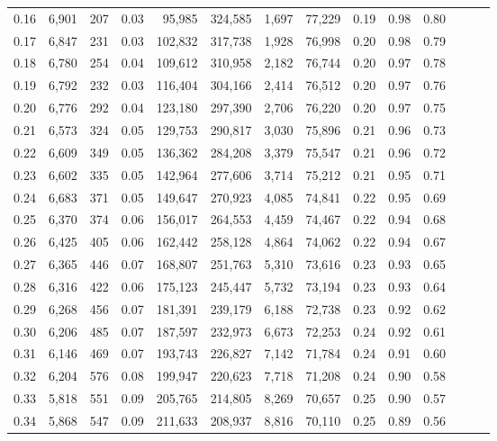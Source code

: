 \begin{tabular}{rrrrrrrrrrrrrr}
0.16 &  6,901 &    207 &  0.03 &   95,985 &  324,585 &   1,697 &  77,229 &  0.19 &  0.98 &      0.80 \\
0.17 &  6,847 &    231 &  0.03 &  102,832 &  317,738 &   1,928 &  76,998 &  0.20 &  0.98 &      0.79 \\
0.18 &  6,780 &    254 &  0.04 &  109,612 &  310,958 &   2,182 &  76,744 &  0.20 &  0.97 &      0.78 \\
0.19 &  6,792 &    232 &  0.03 &  116,404 &  304,166 &   2,414 &  76,512 &  0.20 &  0.97 &      0.76 \\
0.20 &  6,776 &    292 &  0.04 &  123,180 &  297,390 &   2,706 &  76,220 &  0.20 &  0.97 &      0.75 \\
0.21 &  6,573 &    324 &  0.05 &  129,753 &  290,817 &   3,030 &  75,896 &  0.21 &  0.96 &      0.73 \\
0.22 &  6,609 &    349 &  0.05 &  136,362 &  284,208 &   3,379 &  75,547 &  0.21 &  0.96 &      0.72 \\
0.23 &  6,602 &    335 &  0.05 &  142,964 &  277,606 &   3,714 &  75,212 &  0.21 &  0.95 &      0.71 \\
0.24 &  6,683 &    371 &  0.05 &  149,647 &  270,923 &   4,085 &  74,841 &  0.22 &  0.95 &      0.69 \\
0.25 &  6,370 &    374 &  0.06 &  156,017 &  264,553 &   4,459 &  74,467 &  0.22 &  0.94 &      0.68 \\
0.26 &  6,425 &    405 &  0.06 &  162,442 &  258,128 &   4,864 &  74,062 &  0.22 &  0.94 &      0.67 \\
0.27 &  6,365 &    446 &  0.07 &  168,807 &  251,763 &   5,310 &  73,616 &  0.23 &  0.93 &      0.65 \\
0.28 &  6,316 &    422 &  0.06 &  175,123 &  245,447 &   5,732 &  73,194 &  0.23 &  0.93 &      0.64 \\
0.29 &  6,268 &    456 &  0.07 &  181,391 &  239,179 &   6,188 &  72,738 &  0.23 &  0.92 &      0.62 \\
0.30 &  6,206 &    485 &  0.07 &  187,597 &  232,973 &   6,673 &  72,253 &  0.24 &  0.92 &      0.61 \\
0.31 &  6,146 &    469 &  0.07 &  193,743 &  226,827 &   7,142 &  71,784 &  0.24 &  0.91 &      0.60 \\
0.32 &  6,204 &    576 &  0.08 &  199,947 &  220,623 &   7,718 &  71,208 &  0.24 &  0.90 &      0.58 \\
0.33 &  5,818 &    551 &  0.09 &  205,765 &  214,805 &   8,269 &  70,657 &  0.25 &  0.90 &      0.57 \\
0.34 &  5,868 &    547 &  0.09 &  211,633 &  208,937 &   8,816 &  70,110 &  0.25 &  0.89 &      0.56 \\

\end{tabular}
